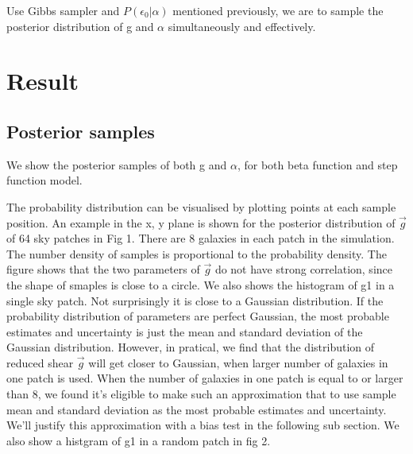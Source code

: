 \documentclass[useAMS,usenatbib]{mn2e}
\begin{document}
Use Gibbs sampler and $P(\epsilon_{0}|\alpha)$ mentioned previously, we
are to sample the posterior distribution of g and $\alpha$ simultaneously
and effectively.




\section{Result}

\label{sec:XXX}


\subsection{Posterior samples}

We show the posterior samples of both g and $\alpha$, for both beta
function and step function model. 

The probability distribution can be visualised by plotting points at each sample
position. An example in the x, y plane is shown for the posterior distribution of
$\vec{g}$ of 64 sky patches in Fig 1. There are 8 galaxies in each patch in the simulation.
The number density of samples is proportional to the probability density. The figure shows that the two parameters of $\vec{g}$
do not have strong correlation, since the shape of smaples is close to a circle.
We also shows the histogram of g1 in a single sky patch. Not surprisingly it is close to a Gaussian distribution.
If the probability distribution of parameters are perfect Gaussian, the most probable estimates and uncertainty 
is just the mean and standard deviation of the Gaussian distribution. However, in pratical, we find that the distribution 
of reduced shear $\vec{g}$ will  get closer to Gaussian, when larger number of galaxies in one patch  is used. When the number of galaxies in 
one patch is equal to or larger than 8, we found it's eligible to make such an approximation that to use sample mean and standard 
deviation as the most probable estimates and uncertainty. We'll justify this approximation with a bias test in the following
sub section. We also show a histgram of g1 in a random patch in fig 2.
\end{document}
